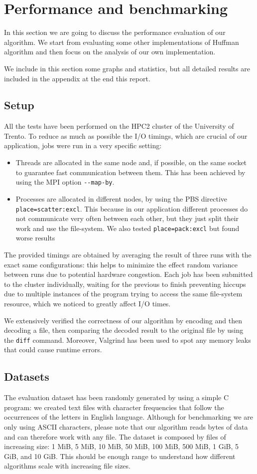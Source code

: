 \section{Performance and benchmarking}
In this section we are going to discuss the performance evaluation of our algorithm. We start from evaluating some other implementations of Huffman algorithm and then focus on the analysis of our own implementation. 

We include in this section some graphs and statistics, but all detailed results are included in the appendix at the end this report.
\subsection{Setup}
All the tests have been performed on the HPC2 cluster of the University of Trento. To reduce as much as possible the I/O timings, which are crucial of our application, jobs were run in a very specific setting:

\begin{itemize}
	\item Threads are allocated in the same node and, if possible, on the same socket to guarantee fast communication between them. This has been achieved by using the MPI option \verb|--map-by|.
	\item Processes are allocated in different nodes, by using the PBS directive \verb|place=scatter:excl|. This because in our application different processes do not communicate very often between each other, but they just split their work and use the file-system. We also tested \verb|place=pack:excl| but found worse results
\end{itemize}

The provided timings are obtained by averaging the result of three runs with the exact same configurations: this helps to minimize the effect random variance between runs due to potential hardware congestion.
Each job has been submitted to the cluster individually, waiting for the previous to finish preventing hiccups due to multiple instances of the program trying to access the same file-system resource, which we noticed to greatly affect I/O times.

We extensively verified the correctness of our algorithm by encoding and then decoding a file, then comparing the decoded result to the original file by using the \verb|diff| command. Moreover, Valgrind has been used to spot any memory leaks that could cause runtime errors.

\subsection{Datasets}
The evaluation dataset has been randomly generated by using a simple C program: we created text files with character frequencies that follow the occurrences of the letters in English language. Although for benchmarking we are only using ASCII characters, please note that our algorithm reads bytes of data and can therefore work with any file.
The dataset is composed by files of increasing size: 1 MiB, 5 MiB, 10 MiB, 50 MiB, 100 MiB, 500 MiB, 1 GiB, 5 GiB, and 10 GiB. This should be enough range to understand how different algorithms scale with increasing file sizes.

